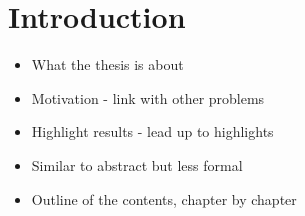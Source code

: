 
\chapter{Introduction}
\label{Chapter1}

\begin{itemize}
\item What the thesis is about
\item Motivation - link with other problems
\item Highlight results - lead up to highlights
\item Similar to abstract but less formal
\item Outline of the contents, chapter by chapter
\end{itemize}


